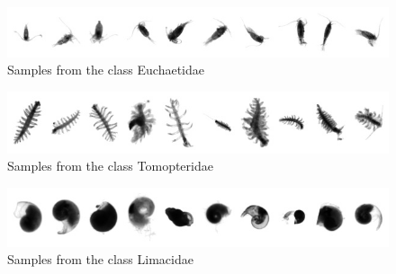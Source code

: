 \begin{figure}[h]
\includegraphics[width=\columnwidth]{collage/083_Euchaetidae.jpg}\caption{Samples from the class Euchaetidae }
\end{figure}
\begin{figure}[h]
\includegraphics[width=\columnwidth]{collage/084_Tomopteridae.jpg}\caption{Samples from the class Tomopteridae }
\end{figure}
\begin{figure}[h]
\includegraphics[width=\columnwidth]{collage/085_Limacidae.jpg}\caption{Samples from the class Limacidae }
\end{figure}
